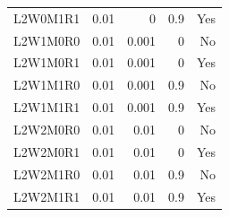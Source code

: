 \begin{table}[htbp]
\begin{tabularx}{\linewidth}{@{}Xrrrr@{}}
L2W0M1R1 & 0.01 & 0 & 0.9 & Yes \\
L2W1M0R0 & 0.01 & 0.001 & 0 & No \\
L2W1M0R1 & 0.01 & 0.001 & 0 & Yes \\
L2W1M1R0 & 0.01 & 0.001 & 0.9 & No \\
L2W1M1R1 & 0.01 & 0.001 & 0.9 & Yes \\
L2W2M0R0 & 0.01 & 0.01 & 0 & No \\
L2W2M0R1 & 0.01 & 0.01 & 0 & Yes \\
L2W2M1R0 & 0.01 & 0.01 & 0.9 & No \\
L2W2M1R1 & 0.01 & 0.01 & 0.9 & Yes \\
\bottomrule
\end{tabularx}
\end{table}
